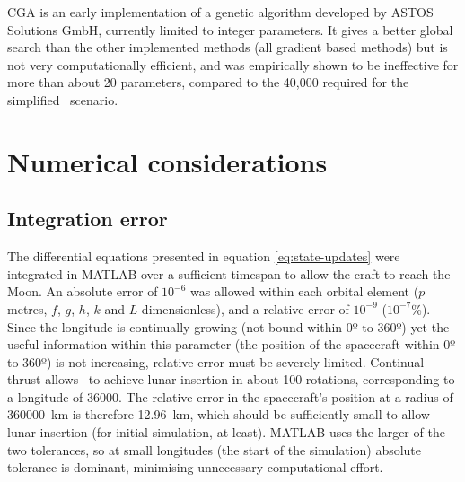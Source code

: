 CGA \parencite[Constrained Genetic Algorithm, ][]{ASTOS_guide} is an early implementation of a genetic algorithm developed by ASTOS Solutions GmbH, currently limited to integer parameters. It gives a better global search than the other implemented methods (all gradient based methods) but is not very computationally efficient, and was empirically shown to be ineffective for more than about 20 parameters, compared to the 40,000 required for the simplified \BW\ scenario.



\section{Numerical considerations} \label{sec:Numerical-considerations}


\subsection{Integration error} \label{sub:Integration-error}

The differential equations presented in equation \eqref{eq:state-updates} were integrated in MATLAB over a sufficient timespan to allow the craft to reach the Moon. An absolute error of $10^{-6}$ was allowed within each orbital element ($p$ metres, $f$, $g$, $h$, $k$ and $L$ dimensionless), and a relative error of $10^{-9}$ ($10^{-7}$\%). Since the longitude is continually growing (not bound within 0º to 360º) yet the useful information within this parameter (the position of the spacecraft within 0º to 360º) is not increasing, relative error must be severely limited. Continual thrust allows \BW\ to achieve lunar insertion in about 100 rotations, corresponding to a longitude of 36000\degrees. The relative error in the spacecraft's position at a radius of 360000~km is therefore 12.96~km, which should be sufficiently small to allow lunar insertion (for initial simulation, at least). MATLAB uses the larger of the two tolerances, so at small longitudes (the start of the simulation) absolute tolerance is dominant, minimising unnecessary computational effort.

